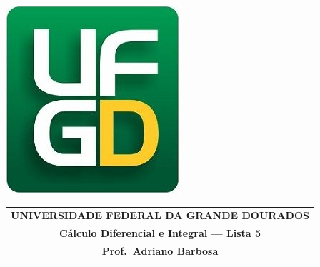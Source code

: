 \documentclass[a4paper,5pt]{amsbook}
\begin{document}
\thispagestyle{empty}
\pagestyle{empty}
\begin{minipage}[h]{0.14\textwidth}
	\includegraphics[scale=0.24]{../ufgd.png}
\end{minipage}
\begin{minipage}[h]{\textwidth}
\begin{tabular}{c}
{{\bf UNIVERSIDADE FEDERAL DA GRANDE DOURADOS}}\\
{{\bf C\'alculo Diferencial e Integral --- Lista 5}}\\
{{\bf Prof.\ Adriano Barbosa}}\\
\end{tabular}
\vspace{-0.45cm}
%
\end{minipage}

\end{document}
